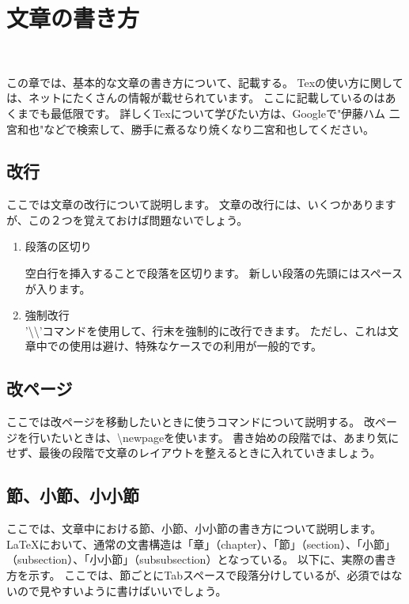 \chapter{文章の書き方} %
\vspace{20mm}\hrulefill\\\vspace{20mm}

この章では、基本的な文章の書き方について、記載する。
Texの使い方に関しては、ネットにたくさんの情報が載せられています。
ここに記載しているのはあくまでも最低限です。
詳しくTexについて学びたい方は、Googleで"伊藤ハム 二宮和也"などで検索して、勝手に煮るなり焼くなり二宮和也してください。

\section{改行}

ここでは文章の改行について説明します。 
文章の改行には、いくつかありますが、この２つを覚えておけば問題ないでしょう。
\begin{enumerate}
    \item 段落の区切り

    空白行を挿入することで段落を区切ります。
    新しい段落の先頭にはスペースが入ります。
    
    \item 強制改行\\'\textbackslash\textbackslash'コマンドを使用して、行末を強制的に改行できます。
    ただし、これは文章中での使用は避け、特殊なケースでの利用が一般的です。

\end{enumerate}

\section{改ページ}

ここでは改ページを移動したいときに使うコマンドについて説明する。
改ページを行いたいときは、\textbackslash newpageを使います。
書き始めの段階では、あまり気にせず、最後の段階で文章のレイアウトを整えるときに入れていきましょう。

\newpage

\section{節、小節、小小節}

ここでは、文章中における節、小節、小小節の書き方について説明します。
\LaTeX において、通常の文書構造は「章」（chapter）、「節」（section）、「小節」（subsection）、「小小節」（subsubsection）となっている。
以下に、実際の書き方を示す。
ここでは、節ごとにTabスペースで段落分けしているが、必須ではないので見やすいように書けばいいでしょう。

